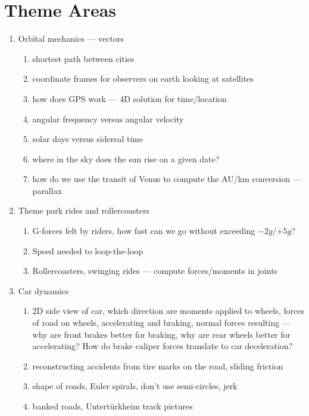 \documentclass{article}
\begin{document}
\tableofcontents

\newpage

\section{Theme Areas}

\begin{enumerate}
\item Orbital mechanics --- vectors
  \begin{enumerate}
  \item shortest path between cities
  \item coordinate frames for observers on earth looking at satellites
  \item how does GPS work --- 4D solution for time/location
  \item angular frequency versus angular velocity
  \item solar days versus sidereal time
  \item where in the sky does the sun rise on a given date?
  \item how do we use the transit of Venus to compute the AU/km
    conversion --- parallax
  \end{enumerate}
\item Theme park rides and rollercoasters
  \begin{enumerate}
  \item G-forces felt by riders, how fast can we go without exceeding $-2g$/$+5g$?
  \item Speed needed to loop-the-loop
  \item Rollercoasters, swinging rides --- compute forces/moments in joints
  \end{enumerate}
\item Car dynamics
  \begin{enumerate}
  \item 2D side view of car, which direction are moments applied to
    wheels, forces of road on wheels, accelerating and braking, normal
    forces resulting --- why are front brakes better for braking, why
    are rear wheels better for accelerating? How do brake caliper
    forces translate to car deceleration?
  \item reconstructing accidents from tire marks on the road, sliding friction
  \item shape of roads, Euler spirals, don't use semi-circles, jerk
  \item banked roads, Untert\"urkheim track pictures
  \end{enumerate}

\end{enumerate}
\end{document}
